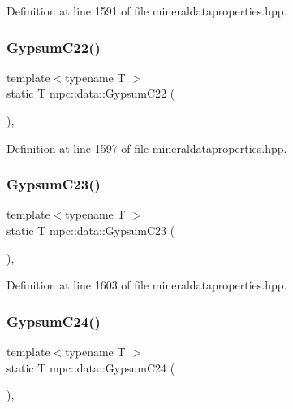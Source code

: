 Definition at line 1591 of file mineraldataproperties.\+hpp.

\mbox{\label{namespacempc_1_1data_a0978c31231459240af9baddc5a73b718}} 
\subsubsection{\texorpdfstring{Gypsum\+C22()}{GypsumC22()}}
{\footnotesize\ttfamily template$<$typename T $>$ \\
static T mpc\+::data\+::\+Gypsum\+C22 (\begin{DoxyParamCaption}{ }\end{DoxyParamCaption})\hspace{0.3cm}{\ttfamily [inline]}, {\ttfamily [static]}}



Definition at line 1597 of file mineraldataproperties.\+hpp.

\mbox{\label{namespacempc_1_1data_a1050ed5720519e5be73b22fdba971dd2}} 
\subsubsection{\texorpdfstring{Gypsum\+C23()}{GypsumC23()}}
{\footnotesize\ttfamily template$<$typename T $>$ \\
static T mpc\+::data\+::\+Gypsum\+C23 (\begin{DoxyParamCaption}{ }\end{DoxyParamCaption})\hspace{0.3cm}{\ttfamily [inline]}, {\ttfamily [static]}}



Definition at line 1603 of file mineraldataproperties.\+hpp.

\mbox{\label{namespacempc_1_1data_a417d2a6a150fd48d1aee5a8253493778}} 
\subsubsection{\texorpdfstring{Gypsum\+C24()}{GypsumC24()}}
{\footnotesize\ttfamily template$<$typename T $>$ \\
static T mpc\+::data\+::\+Gypsum\+C24 (\begin{DoxyParamCaption}{ }\end{DoxyParamCaption})\hspace{0.3cm}{\ttfamily [inline]}, {\ttfamily [static]}}



